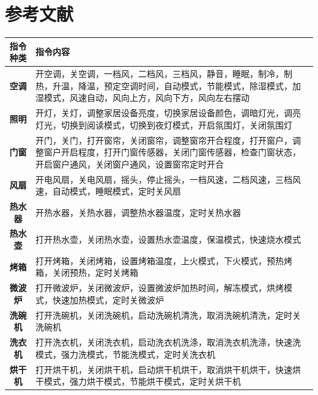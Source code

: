 \documentclass[lang=cn,cite=super]{elegantpaper}
\begin{document}
\section*{参考文献}

\newpage
\appendix
\label{appendix:A}
\begin{table}[H]
    \begin{tabularx}{\linewidth}{cX}
        \toprule
        指令种类 & 指令内容\\
        \midrule
        \textbf{空调} & 开空调，关空调，一档风，二档风，三档风，静音，睡眠，制冷，制热，升温，降温，预定空调时间，自动模式，节能模式，除湿模式，加湿模式，风速自动，风向上方，风向下方，风向左右摆动\\
        \textbf{照明} & 开灯，关灯，调整家居设备亮度，切换家居设备颜色，调暗灯光，调亮灯光，切换到阅读模式，切换到夜灯模式，开启氛围灯，关闭氛围灯\\
        \textbf{门窗} & 开门，关门，打开窗帘，关闭窗帘，调整窗帘开合程度，打开窗户，调整窗户开启程度，打开门窗传感器，关闭门窗传感器，检查门窗状态，开启窗户通风，关闭窗户通风，设置窗帘定时开合\\
        \textbf{风扇} & 开电风扇，关电风扇，摇头，停止摇头，一档风速，二档风速，三档风速，自动模式，睡眠模式，定时关风扇\\
        \textbf{热水器} & 开热水器，关热水器，调整热水器温度，定时关热水器\\
        \textbf{热水壶} & 打开热水壶，关闭热水壶，设置热水壶温度，保温模式，快速烧水模式\\
        \textbf{烤箱} & 打开烤箱，关闭烤箱，设置烤箱温度，上火模式，下火模式，预热烤箱，关闭预热，定时关烤箱\\
        \textbf{微波炉} & 打开微波炉，关闭微波炉，设置微波炉加热时间，解冻模式，烘烤模式，快速加热模式，定时关微波炉\\
        \textbf{洗碗机} & 打开洗碗机，关闭洗碗机，启动洗碗机清洗，取消洗碗机清洗，定时关洗碗机\\
        \textbf{洗衣机} & 打开洗衣机，关闭洗衣机，启动洗衣机洗涤，取消洗衣机洗涤，快速洗模式，强力洗模式，节能洗模式，定时关洗衣机\\
        \textbf{烘干机} & 打开烘干机，关闭烘干机，启动烘干机烘干，取消烘干机烘干，快速烘干模式，强力烘干模式，节能烘干模式，定时关烘干机\\

\end{tabularx}
\end{table}
\end{document}
